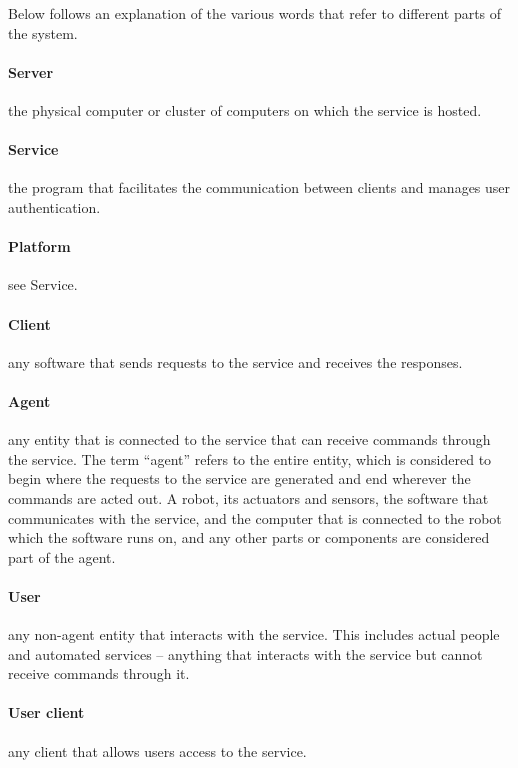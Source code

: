 Below follows an explanation of the various words that refer to different parts of the system.

\paragraph{Server} the physical computer or cluster of computers on which the service is hosted.

\paragraph{Service} the program that facilitates the communication between clients and manages user authentication.

\paragraph{Platform} see Service.

\paragraph{Client} any software that sends requests to the service and receives the responses.

\paragraph{Agent} any entity that is connected to the service that can receive commands through the service.
The term ``agent'' refers to the entire entity, which is considered to begin where the requests to the service are generated and end wherever the commands are acted out.
A robot, its actuators and sensors, the software that communicates with the service, and the computer that is connected to the robot which the software runs on, and any other parts or components are considered part of the agent.

\paragraph{User} any non-agent entity that interacts with the service.
This includes actual people and automated services -- anything that interacts with the service but cannot receive commands through it.

\paragraph{User client} any client that allows users access to the service.


